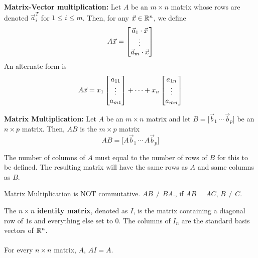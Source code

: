 \documentclass[english, 12pt]{article}
\begin{document}
\begin{defn}
\textbf{Matrix-Vector multiplication:} Let $A$ be an $m \times n$ matrix whose rows are denoted $\vec{a}_{i}^T$ for $1 \leq i \leq m$. Then, for any $\vec{x} \in {\mathbb{R}}^n$, we define
\[ A \vec{x} = \begin{bmatrix} \vec{a}_{1} \cdot \vec{x} \\ \vdots \\ \vec{a}_{m} \cdot \vec{x} \end{bmatrix} \]
An alternate form is 
\[ A \vec{x} = x_{1} \begin{bmatrix} a_{11} \\ \vdots \\ a_{m1} \end{bmatrix} + \cdots + x_{n} \begin{bmatrix} a_{1n} \\ \vdots \\ a_{mn} \end{bmatrix} \]
\end{defn}

\begin{mthd}
\textbf{Matrix Multiplication:} Let $A$ be an $m \times n$ matrix and let $B = \lbrack \vec{b}_{1}\, \cdots\, \vec{b}_{p} \rbrack$ be an $n \times p$ matrix. Then, $AB$ is the $m \times p$ matrix 
\[ AB = \lbrack A \vec{b}_{1} \, \cdots \, A \vec{b}_{p}\rbrack \]
\end{mthd}

\begin{note}
The number of columns of $A$ must equal to the number of rows of $B$ for this to be defined. The resulting matrix will have the same rows as $A$ and same columns as $B$.
\end{note}

\begin{qte}
Matrix Multiplication is NOT commutative. $AB \neq BA$., if $AB = AC$, $B \neq C$.
\end{qte}

\begin{defn}
The $n \times n$ \textbf{identity matrix}, denoted as $I$, is the matrix containing a diagonal row of $1$s and everything else set to $0$. The columns of $I_{n}$ are the standard basis vectors of ${\mathbb{R}}^n$. \\\\
For every $n \times n$ matrix, $A$, $AI = A$.
\end{defn}
\end{document}

